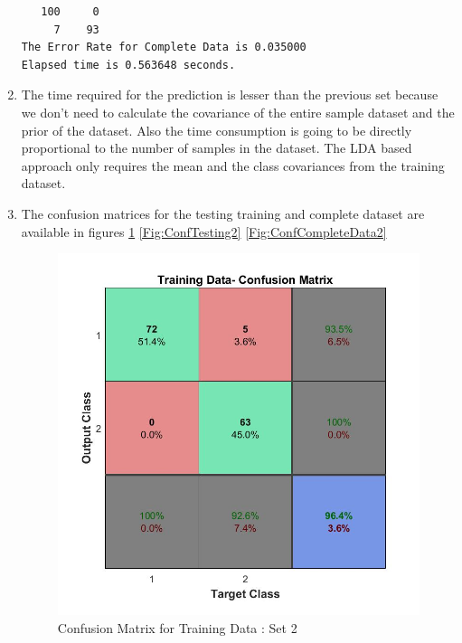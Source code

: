 \documentclass[10pt, letterpaper]{article}
\begin{document}
\begin{enumerate}
\begin{verbatim}
   100     0
     7    93
The Error Rate for Complete Data is 0.035000
Elapsed time is 0.563648 seconds.

\end{verbatim}
\item The time required for the prediction is lesser than the previous set because we don't need to calculate the covariance of the entire sample dataset and the prior of the dataset.  Also the time consumption is going to be directly proportional to the number of samples in the dataset.  The LDA based approach only requires the mean and the class covariances from the training dataset. 

\item The confusion matrices for the testing training and complete dataset are available in figures \ref{Fig:ConfTraining2} \ref{Fig:ConfTesting2} \ref{Fig:ConfCompleteData2}

\begin{figure}[h!]
\centering
\includegraphics[scale=0.5]{TrainingData_Confusion-2.jpg}
\caption{Confusion Matrix for Training Data : Set 2}
\label{Fig:ConfTraining2}
\end{figure} 



\end{enumerate}
\end{document}
